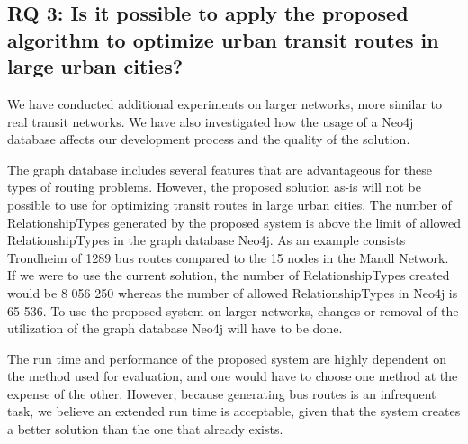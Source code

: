 \subsection*{RQ 3: Is it possible to apply the proposed algorithm to optimize urban transit routes in large urban cities?}

We have conducted additional experiments on larger networks, more similar to real transit networks. We have also investigated how the usage of a Neo4j database affects our development process and the quality of the solution. \newline

The graph database includes several features that are advantageous for these types of routing problems. However, the proposed solution as-is will not be possible to use for optimizing transit routes in large urban cities. The number of RelationshipTypes generated by the proposed system is above the limit of allowed RelationshipTypes in the graph database Neo4j. As an example consists Trondheim of 1289 bus routes compared to the 15 nodes in the Mandl Network. If we were to use the current solution, the number of RelationshipTypes created would be 8 056 250 whereas the number of allowed RelationshipTypes in Neo4j is 65 536. To use the proposed system on larger networks, changes or removal of the utilization of the graph database Neo4j will have to be done. \newline

The run time and performance of the proposed system are highly dependent on the method used for evaluation, and one would have to choose one method at the expense of the other. However, because generating bus routes is an infrequent task, we believe an extended run time is acceptable, given that the system creates a better solution than the one that already exists.  